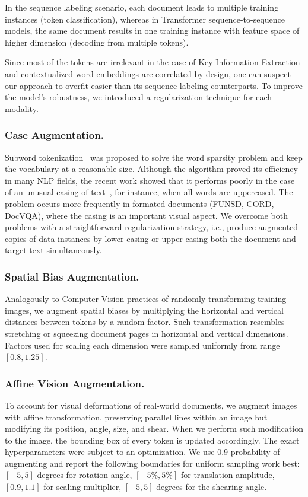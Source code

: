 \documentclass[runningheads]{llncs}
\begin{document}
In the sequence labeling scenario, each document leads to multiple training instances (token classification), whereas in Transformer sequence-to-sequence models, the same document results in one training instance with feature space of higher dimension (decoding from multiple tokens).

Since most of the tokens are irrelevant in the case of Key Information Extraction and contextualized word embeddings are correlated by design, one can suspect our approach to overfit easier than its sequence labeling counterparts. To improve the model's robustness, we introduced a regularization technique for each modality.

\subsubsection{Case Augmentation.}
Subword tokenization~\cite{sennrich-etal-2016-neural,kudo-2018-subword} was proposed to solve the word sparsity problem and keep the vocabulary at a reasonable size. 
Although the algorithm proved its efficiency in many NLP fields, the recent work showed that it performs poorly in the case of an unusual casing of text~\cite{powalski2020unicase}, for instance, when all words are uppercased. The problem occurs more frequently in formated documents (FUNSD, CORD, DocVQA), where the casing is an important visual aspect.
We overcome both problems with a straightforward regularization strategy, i.e., produce augmented copies of data instances by lower-casing or upper-casing both the document and target text simultaneously.





\subsubsection{Spatial Bias Augmentation.}
Analogously to Computer Vision practices of randomly transforming training images, we augment spatial biases by multiplying the horizontal and vertical distances between tokens by a random factor. Such transformation resembles stretching or squeezing document pages in horizontal and vertical dimensions. Factors used for scaling each dimension were sampled uniformly from range $[0.8, 1.25]$.

\subsubsection{Affine Vision Augmentation.}
To account for visual deformations of real-world documents, we augment images with affine transformation, preserving parallel lines within an image but modifying its position, angle, size, and shear. When we perform such modification to the image, the bounding box of every token is updated accordingly.
The exact hyperparameters were subject to an optimization. We use 0.9 probability of augmenting and report the following boundaries for uniform sampling work best: $[-5, 5]$ degrees for rotation angle, $[-5\%, 5\%]$ for translation amplitude, $[0.9, 1.1]$ for scaling multiplier, $[-5, 5]$ degrees for the shearing angle.
\end{document}
